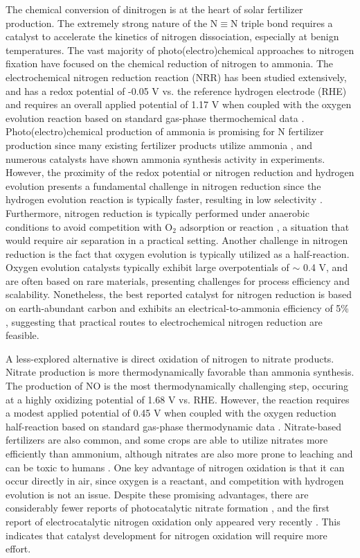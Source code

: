 The chemical conversion of dinitrogen is at the heart of solar fertilizer production. The extremely strong nature of the N$\equiv$N triple bond requires a catalyst to accelerate the kinetics of nitrogen dissociation, especially at benign temperatures. The vast majority of photo(electro)chemical approaches to nitrogen fixation have focused on the chemical reduction of nitrogen to ammonia. The electrochemical nitrogen reduction reaction (NRR) has been studied extensively, and has a redox potential of -0.05 V vs. the reference hydrogen electrode (RHE) and requires an overall applied potential of 1.17 V when coupled with the oxygen evolution reaction based on standard gas-phase thermochemical data \cite{Medford_2017}. Photo(electro)chemical production of ammonia is promising for N fertilizer production since many existing fertilizer products utilize ammonia  \cite{Waller_2016}, and numerous catalysts have shown ammonia synthesis activity in experiments. However, the proximity of the redox potential or nitrogen reduction and hydrogen evolution presents a fundamental challenge in nitrogen reduction since the hydrogen evolution reaction is typically faster, resulting in low selectivity \cite{Skulason_2012,Singh_2017}. Furthermore, nitrogen reduction is typically performed under anaerobic conditions to avoid competition with O$_2$ adsorption or reaction \cite{Hirakawa_2017}, a situation that would require air separation in a practical setting. Another challenge in nitrogen reduction is the fact that oxygen evolution is typically utilized as a half-reaction. Oxygen evolution catalysts typically exhibit large overpotentials of $\sim$ 0.4 V, and are often based on rare materials, presenting challenges for process efficiency and scalability. Nonetheless, the best reported catalyst for nitrogen reduction is based on earth-abundant carbon and exhibits an electrical-to-ammonia efficiency of 5\% \cite{Song_2018}, suggesting that practical routes to electrochemical nitrogen reduction are feasible.

A less-explored alternative is direct oxidation of nitrogen to nitrate products. Nitrate production is more thermodynamically favorable than ammonia synthesis. The production of NO is the most thermodynamically challenging step, occuring at a highly oxidizing potential of 1.68 V vs. RHE. However, the reaction requires a modest applied potential of 0.45 V when coupled with the oxygen reduction half-reaction based on standard gas-phase thermodynamic data \cite{Chen_2018,Medford_2017, Comer_2018}. Nitrate-based fertilizers are also common, and some crops are able to utilize nitrates more efficiently than ammonium, although nitrates are also more prone to leaching and can be toxic to humans \cite{Wiesler_1998,Yao_2011,Mancino_1990, NAP9038}. One key advantage of nitrogen oxidation is that it can occur directly in air, since oxygen is a reactant, and competition with hydrogen evolution is not an issue. Despite these promising advantages, there are considerably fewer reports of photocatalytic nitrate formation \cite{Bickley_1979,Yuan_2013}, and the first report of electrocatalytic nitrogen oxidation only appeared very recently \cite{Wang_2019}. This indicates that catalyst development for nitrogen oxidation will require more effort.

